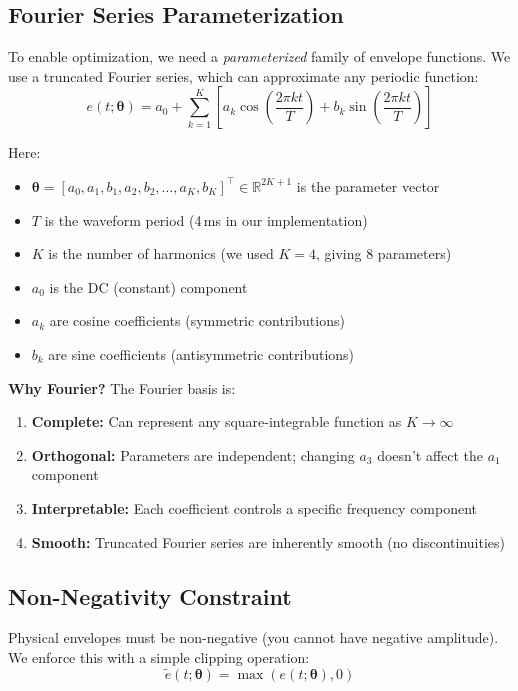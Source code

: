 \documentclass[11pt]{article}
\begin{document}
\subsection{Fourier Series Parameterization}

To enable optimization, we need a \textit{parameterized} family of envelope functions. We use a truncated Fourier series, which can approximate any periodic function:
\begin{equation}
    e(t; \boldsymbol{\theta}) = a_0 + \sum_{k=1}^{K} \left[ a_k \cos\left(\frac{2\pi k t}{T}\right) + b_k \sin\left(\frac{2\pi k t}{T}\right) \right]
\end{equation}

Here:
\begin{itemize}
    \item $\boldsymbol{\theta} = [a_0, a_1, b_1, a_2, b_2, \ldots, a_K, b_K]^\top \in \mathbb{R}^{2K+1}$ is the parameter vector
    \item $T$ is the waveform period (4\,ms in our implementation)
    \item $K$ is the number of harmonics (we used $K = 4$, giving 8 parameters)
    \item $a_0$ is the DC (constant) component
    \item $a_k$ are cosine coefficients (symmetric contributions)
    \item $b_k$ are sine coefficients (antisymmetric contributions)
\end{itemize}

\textbf{Why Fourier?} The Fourier basis is:
\begin{enumerate}
    \item \textbf{Complete:} Can represent any square-integrable function as $K \to \infty$
    \item \textbf{Orthogonal:} Parameters are independent; changing $a_3$ doesn't affect the $a_1$ component
    \item \textbf{Interpretable:} Each coefficient controls a specific frequency component
    \item \textbf{Smooth:} Truncated Fourier series are inherently smooth (no discontinuities)
\end{enumerate}

\subsection{Non-Negativity Constraint}

Physical envelopes must be non-negative (you cannot have negative amplitude). We enforce this with a simple clipping operation:
\begin{equation}
    \tilde{e}(t; \boldsymbol{\theta}) = \max\left(e(t; \boldsymbol{\theta}), 0\right)
\end{equation}
\end{document}
